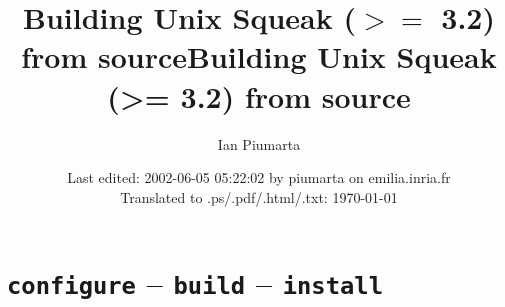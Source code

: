 \documentclass{article}
\begin{document}
\latexhtml
  {\title{Building Unix Squeak ($>=$ 3.2) from source}}%
  {\title{Building Unix Squeak (>= 3.2) from source}}
\author{Ian Piumarta\\
}
\date{\small Last edited: 2002-06-05 05:22:02 by piumarta on emilia.inria.fr
\\Translated to .ps/.pdf/.html/.txt: \today}
\maketitle
\tableofcontents

% 

\section{\texttt{configure} -- \texttt{build} -- \texttt{install}}
\end{document}
